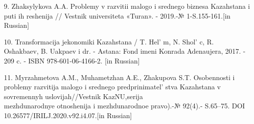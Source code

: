 \begin{references}
9. Zhaksylykova A.A. Problemy v razvitii malogo i srednego biznesa
Kazahstana i puti ih reshenija // Vestnik universiteta «Turan». -
2019.-№ 1-S.155-161.{[}in Russian{]}

10. Transformacija jekonomiki Kazahstana / T. Hel' m, N.
Shol' c, R. Oshakbaev, B. Uakpaev i dr. - Astana: Fond
imeni Konrada Adenaujera, 2017. - 209 c. - ISBN 978-601-06-4166-2. {[}in
Russian{]}

11. Myrzahmetova A.M., Muhametzhan A.E., Zhakupova S.T. Osobennosti i
problemy razvitija malogo i srednego predprinimatel' stva
Kazahstana v sovremennyh uslovijah//Vestnik KazNU,serija \\mezhdunarodnye
otnoshenija i mezhdunarodnoe pravo).-№ 92(4).- S.65--75. DOI\\
10.26577/IRILJ.2020.v92.i4.07.{[}in Russian{]}
\end{references}

